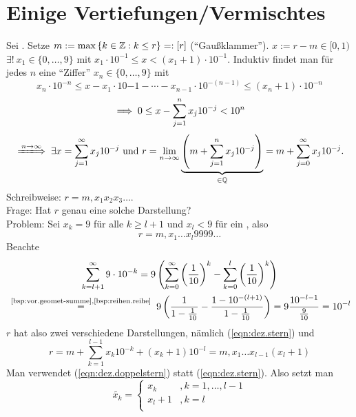 \documentclass[12pt]{scrreprt}
\begin{document}
\section{Einige Vertiefungen/Vermischtes}
\label{sec:reihen.vermischtes}

\begin{bsp}[Dezimaldarstellung]
  \label{bsp:reihen.dez}
  Sei . Setze $m:=\max{\{k\in\ensuremath{\mathbb{Z}}:k\le r\}} =: [r]$
  ("`Gaußklammer"'). \folgt $x:=r-m \in [0,1)$ \folgt $\exists!\ x_1
  \in \{0,\dotsc,9\}$ mit $x_1\cdot10^{-1} \le x <
  (x_1+1)\cdot10^{-1}$.
  Induktiv findet man für jedes $n$ eine "`Ziffer"'
  $x_n\in\{0,\dotsc,9\}$ mit \[x_n\cdot10^{-n} \le
  x-x_1\cdot10{-1}-\dotsb-x_{n-1}\cdot10^{-(n-1)} \le
  (x_n+1)\cdot10^{-n}\]
  \[\implies 0 \le x - \sum_{j=1}^{n}{x_j10^{-j}}<10^n\]
  \[\folgtwegen{\ninf} \exists x=\sum_{j=1}^{\infty}x_j10^{-j} \text{
    und } r =
  \lim_{\ninf}{\underbrace{\left(m+\sum_{j=1}^n{x_j10^{-j}}\right)}_{\in\set{Q}}}=m+\sum_{j=0}^{\infty}{x_j10^{-j}}.\]
    Schreibweise: $r=m{,}x_1x_2x_3\dotsc$.\\
  Frage: Hat $r$ genau eine solche Darstellung?\\
  Problem: Sei $x_k=9$ für alle $k\ge l+1$ und $x_l<9$ für ein
  , also
  \begin{equation}
    \label{eqn:dez.stern}
    r=m{,}x_1\dotsc x_l9999\dotsc \tag{$*$}
  \end{equation}
  Beachte \begin{multline*}
    \sum_{k=l+1}^{\infty}{9\cdot10^{-k}} =
    9\left(\sum_{k=0}^{\infty}\left(\frac{1}{10}\right)^k-\sum_{k=0}^l\left(\frac{1}{10}\right)^k\right)
    \\\nach{=}{\ref{bsp:vor.geomet-summe},\ref{bsp:reihen.reihe}}
    9\left(\frac{1}{1-\frac{1}{10}}-\frac{1-10^{-(l+1)}}{1-\frac{1}{10}}\right)
    = 9\frac{10^{-l-1}}{\frac{9}{10}}=10^{-l}
  \end{multline*}
  $r$ hat also zwei verschiedene Darstellungen, nämlich
  (\ref{eqn:dez.stern}) und
  \begin{equation}
    \label{eqn:dez.doppelstern}
    r=m+\sum_{k=1}^{l-1}{x_k10^{-k}}+(x_k+1)10^{-l}=m{,}x_1\dotsc
    x_{l-1}(x_l+1) \tag{$**$}
  \end{equation}
  Man verwendet (\ref{eqn:dez.doppelstern}) statt
  (\ref{eqn:dez.stern}). Also setzt man
  \[\widetilde{x_k}=
  \begin{cases}
    x_k   &, k=1,\dotsc,l-1 \\
    x_l+1 &, k=l \\

\end{cases}\]
\end{bsp}
\end{document}
